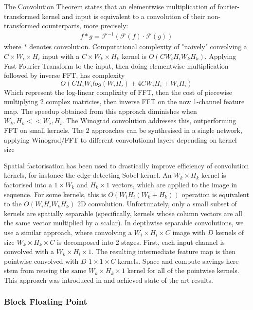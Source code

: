 \documentclass[12pt]{article}
\newcommand{\Fourier}{\mathcal{F}}
\begin{document}
The Convolution Theorem states that an elementwise multiplication of fourier-transformed kernel and input is equivalent to a convolution of their non-transformed counterparts, more precisely:
\begin{gather}
	f * g = \Fourier^{-1}(\Fourier(f) \cdot \Fourier(g))
\end{gather}
where $*$ denotes convolution.
Computational complexity of "naively" convolving a $C \times W_i \times H_i$ input with a $C \times W_k \times H_k$ kernel is $O(CW_iH_iW_kH_k)$.
Applying Fast Fourier Transform to the input, then doing elementwise multiplication followed by inverse FFT, has complexity
$$O(CH_iW_ilog(W_iH_i) + 4CW_iH_i + W_iH_i)$$
Which represent the log-linear complixity of FFT, then the cost of piecewise multiplying 2 complex matricies,
then inverse FFT on the now 1-channel feature map. The speedup obtained from this approach diminishes when $W_k, H_k << W_i, H_i$\cite{liu2016pruning}.
The Winograd convolution addresses this, outperforming FFT on small kernels.
The 2 approaches can be synthesised in a single network, applying Winograd/FFT to different convolutional layers depending on kernel size \cite{zhuge2018face}

Spatial factorisation has been used to drastically improve efficiency of convolution kernels, for instance the edge-detecting Sobel kernel.
An $W_k \times H_k$ kernel is factorised into a $1 \times W_k$ and $H_k \times 1$ vectors, which are applied to the image in sequence.
For some kernels, this is $O(W_iH_i(W_k + H_k))$ operation is equivalent to the $O(W_iH_iW_kH_k)$ 2D convolution.
Unfortunately, only a small subset of kernels are spatially separable (specifically, kernels whose column vectors are all the same vector multiplied by a scalar).
In depthwise separable convolutions, we use a similar approach, where convolving a $W_i \times H_i \times C$ image with $D$ kernels of size $W_k \times H_k \times C$ is decomposed into 2 stages.
First, each input channel is convolved with a $W_k \times H_l \times 1$.
The resulting intermediate feature map is then pointwise convolved with $D$ $1 \times 1 \times C$ kernels.
Space and compute savings here stem from reusing the same $W_k \times H_k \times 1$ kernel for all of the pointwise kernels.
This approach was introduced in \cite{howard2017mobilenets} and achieved state of the art results.

\subsubsection{Block Floating Point}
\end{document}

